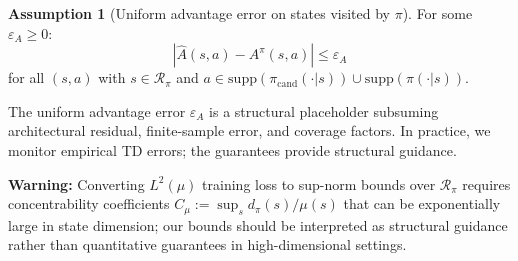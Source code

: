 \documentclass{article}
\theoremstyle{plain}
\theoremstyle{definition}
\newtheorem{assumption}[theorem]{Assumption}
\theoremstyle{remark}
\newcommand{\shortonly}[1]{#1}
\newcommand{\shortonly}[1]{}
\begin{document}
\begin{assumption}[Uniform advantage error on states visited by $\pi$]
\label{ass:Ahat_error_bound}
For some $\varepsilon_A\ge 0$:
\begin{equation}
|\widehat{A}(s,a) - A^\pi(s,a)| \le \varepsilon_A
\end{equation}
for all $(s,a)$ with $s \in \mathcal{R}_{\pi}$ and
$a \in \mathrm{supp}(\pi_{\mathrm{cand}}(\cdot|s)) \cup \mathrm{supp}(\pi(\cdot|s))$.
\end{assumption}

\shortonly{The uniform advantage error $\varepsilon_A$ is a structural placeholder subsuming architectural residual, finite-sample error, and coverage factors. In practice, we monitor empirical TD errors; the guarantees provide structural guidance.

\textbf{Warning:} Converting $L^2(\mu)$ training loss to sup-norm bounds over $\mathcal{R}_\pi$ requires concentrability coefficients $C_\mu := \sup_s d_\pi(s)/\mu(s)$ that can be exponentially large in state dimension; our bounds should be interpreted as structural guidance rather than quantitative guarantees in high-dimensional settings.}
\end{document}
